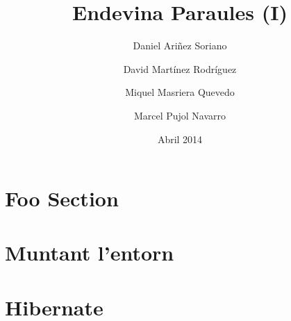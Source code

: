 \documentclass[a4paper]{scrartcl}
\title{Endevina Paraules (I)}
\date{Abril 2014}
\author{Daniel Ariñez Soriano}
\author{David Martínez Rodríguez}
\author{Miquel Masriera Quevedo}
\author{Marcel Pujol Navarro\vspace{11cm}}
\affil{Arquitectura del Software\\Facultat d'Informàtica de Barcelona, UPC}
\begin{document}
	
	\maketitle
	\newpage
	\tableofcontents %
	\cleardoublepage

\section{Foo Section} 


\section{Muntant l'entorn}


\section{Hibernate}


\nocite{*}


\end{document}
